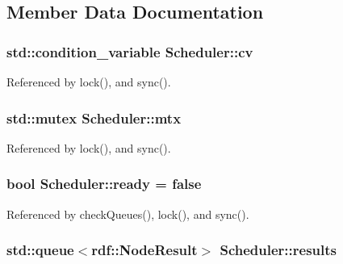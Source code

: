 \subsection{Member Data Documentation}
\subsubsection[{\texorpdfstring{cv}{cv}}]{\setlength{\rightskip}{0pt plus 5cm}std\+::condition\+\_\+variable Scheduler\+::cv\hspace{0.3cm}{\ttfamily [private]}}\hypertarget{classScheduler_ac0bfe3868a5c8ba5205a8a50f6459083}{}\label{classScheduler_ac0bfe3868a5c8ba5205a8a50f6459083}


Referenced by lock(), and sync().

\subsubsection[{\texorpdfstring{mtx}{mtx}}]{\setlength{\rightskip}{0pt plus 5cm}std\+::mutex Scheduler\+::mtx\hspace{0.3cm}{\ttfamily [private]}}\hypertarget{classScheduler_a19d05f87e9815e222ec52bcbfa81e435}{}\label{classScheduler_a19d05f87e9815e222ec52bcbfa81e435}


Referenced by lock(), and sync().

\subsubsection[{\texorpdfstring{ready}{ready}}]{\setlength{\rightskip}{0pt plus 5cm}bool Scheduler\+::ready = false\hspace{0.3cm}{\ttfamily [private]}}\hypertarget{classScheduler_a9a7edcef4b80171f8bb4b2802a3bc31f}{}\label{classScheduler_a9a7edcef4b80171f8bb4b2802a3bc31f}


Referenced by check\+Queues(), lock(), and sync().

\subsubsection[{\texorpdfstring{results}{results}}]{\setlength{\rightskip}{0pt plus 5cm}std\+::queue$<${\bf rdf\+::\+Node\+Result}$>$ Scheduler\+::results\hspace{0.3cm}{\ttfamily [private]}}\hypertarget{classScheduler_a93faf0df4ed95016cdb5224bd2725c3f}{}\label{classScheduler_a93faf0df4ed95016cdb5224bd2725c3f}


